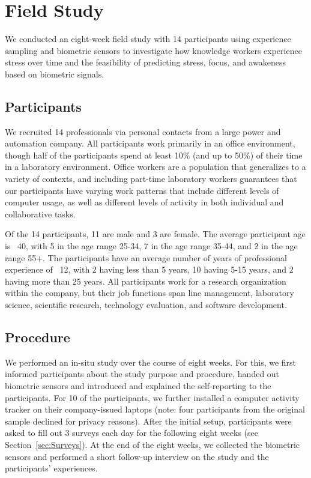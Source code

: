 \section{Field Study}
We conducted an eight-week field study with 14 participants using experience sampling and biometric sensors to investigate how knowledge workers experience stress over time and the feasibility of predicting stress, focus, and awakeness based on biometric signals. 


\subsection{Participants}
We recruited 14 professionals via personal contacts from a large power and automation company. All participants work primarily in an office environment, though half of the participants spend at least 10\% (and up to 50\%) of their time in a laboratory environment. Office workers are a population that generalizes to a variety of contexts, and including part-time laboratory workers guarantees that our participants have varying work patterns that include different levels of computer usage, as well as different levels of activity in both individual and collaborative tasks.

Of the 14 participants, 11 are male and 3 are female. The average participant age is ~40, with 5 in the age range 25-34, 7 in the age range 35-44, and 2 in the age range 55+. The participants have an average number of years of professional experience of ~12, with 2 having less than 5 years, 10 having 5-15 years, and 2 having more than 25 years. All participants work for a research organization within the company, but their job functions span line management, laboratory science, scientific research, technology evaluation, and software development.


\subsection{Procedure}
We performed an in-situ study over the course of eight weeks. For this, we first informed participants about the study purpose and procedure, handed out biometric sensors and introduced and explained the self-reporting to the participants. For 10 of the participants, we further installed a computer activity tracker on their company-issued laptops (note: four participants from the original sample declined for privacy reasons). After the initial setup, participants were asked to fill out 3 surveys each day for the following eight weeks (see Section~\ref{sec:Surveys}). At the end of the eight weeks, we collected the biometric sensors and performed a short follow-up interview on the study and the participants' experiences.

